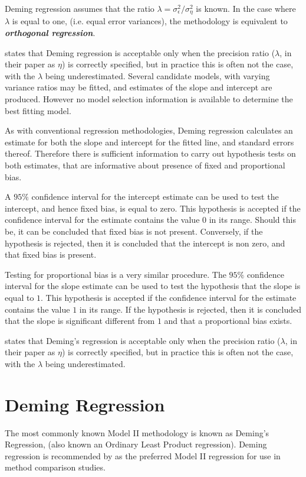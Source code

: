 \documentclass[12pt, a4paper]{report}
\theoremstyle{plain}
\theoremstyle{definition}
\theoremstyle{remark}
\begin{document}
Deming regression assumes that the ratio $\lambda = \sigma^2_{\epsilon}/\sigma^2_{\eta}$ is known. In the case where $\lambda$ is equal to one, (i.e. equal error variances), the methodology is equivalent to \textit{\textbf{orthogonal regression}}.


\citet{CarollRupert} states that Deming
regression is acceptable only when the precision ratio ($\lambda$, in their paper as $\eta$) is correctly specified, but in practice this is often not the case, with the $\lambda$ being underestimated. Several candidate models, with varying variance ratios may be fitted, and estimates of the slope and intercept are produced. However no model selection information is available to determine the best fitting model.

	
	As with conventional regression methodologies, Deming regression calculates an estimate for both the slope and intercept for the
	fitted line, and standard errors thereof. Therefore there is sufficient information to carry out hypothesis tests on both
	estimates, that are informative about presence of fixed and proportional bias.
	
	A $95\%$ confidence interval for the intercept estimate can be used to test the intercept, and hence fixed bias, is equal to
	zero. This hypothesis is accepted if the confidence interval for the estimate contains the value $0$ in its range. Should this be,
	it can be concluded that fixed bias is not present. Conversely, if the hypothesis is rejected, then it is concluded that the
	intercept is non zero, and that fixed bias is present.
	
	Testing for proportional bias is a very similar procedure. The
	$95\%$ confidence interval for the slope estimate can be used to
	test the hypothesis that the slope is equal to $1$. This
	hypothesis is accepted if the confidence interval for the estimate
	contains the value $1$ in its range. If the hypothesis is
	rejected, then it is concluded that the slope is significant
	different from $1$ and that a proportional bias exists.
	
	
	
	
	\citet{CarollRupert} states that Deming's
	regression is acceptable only when the precision ratio ($\lambda$,
	in their paper as $\eta$) is correctly specified, but in practice
	this is often not the case, with the $\lambda$ being
	underestimated.
	
	
\section{Deming Regression}
The most commonly known Model II methodology is known as Deming's Regression, (also known an Ordinary Least Product regression). Deming regression is recommended by \citet*{CornCoch} as the preferred Model II regression for use in method comparison studies.
\end{document}
